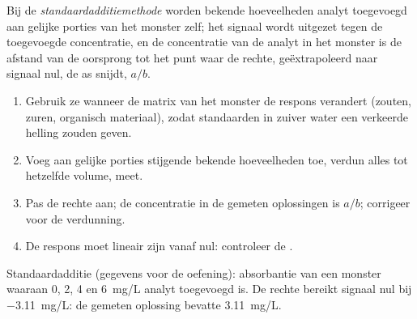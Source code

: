 \begin{definition}[Standaardadditie]\label{def:b2:measurement-statistics:standard-addition}
Bij de \emph{standaardadditiemethode} worden bekende hoeveelheden analyt
toegevoegd aan gelijke porties van het monster zelf; het signaal wordt uitgezet tegen de toegevoegde concentratie,
en de concentratie van de analyt in het monster is de afstand van de oorsprong tot het punt waar
de rechte, geëxtrapoleerd naar signaal nul, de as snijdt, $a/b$.
\end{definition}

\begin{method}[Standaardadditie]\label{met:b2:measurement-statistics:standard-addition}
\begin{enumerate}
  \item Gebruik ze wanneer de matrix van het monster de respons verandert (zouten, zuren, organisch materiaal), zodat
        standaarden in zuiver water een verkeerde helling zouden geven.
  \item Voeg aan gelijke porties stijgende bekende hoeveelheden toe, verdun alles tot hetzelfde volume, meet.
  \item Pas de rechte aan; de concentratie in de gemeten oplossingen is $a/b$; corrigeer voor de verdunning.
  \item De respons moet lineair zijn vanaf nul: controleer de .
\end{enumerate}
\end{method}

\begin{omfigure}

{\small Standaardadditie (gegevens voor de oefening): absorbantie van een monster waaraan 0, 2, 4 en
\qty{6}{mg/L} analyt toegevoegd is. De rechte bereikt signaal nul bij \qty{-3.11}{mg/L}: de gemeten oplossing
bevatte \qty{3.11}{mg/L}.}
\end{omfigure}

